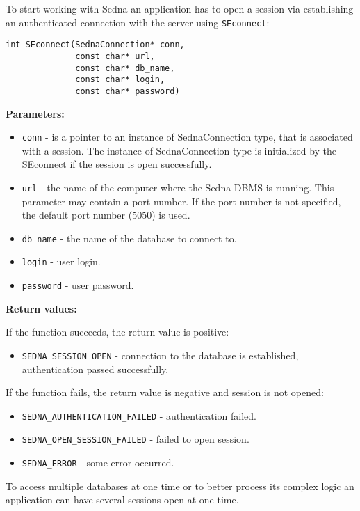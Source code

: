 \documentclass[a4paper,12pt]{article}
\newenvironment{citemize}
{\begin{itemize}
  \setlength{\itemsep}{0pt}
  \setlength{\parskip}{0pt}
  \setlength{\parsep}{0pt}}
{\end{itemize}}
\begin{document}
To start working with Sedna an application has to open a session via
establishing an authenticated connection with the server using \verb!SEconnect!:

\begin{verbatim}
int SEconnect(SednaConnection* conn,
              const char* url,
              const char* db_name,
              const char* login,
              const char* password)
\end{verbatim}

\noindent
\textbf{Parameters:}

\begin{citemize}
\item\verb!conn! - is a pointer to an instance of SednaConnection type, that is
associated with a session. The instance of SednaConnection type is initialized
by the SEconnect if the session is open successfully.
\item\verb!url! - the name of the computer where the Sedna DBMS is running. This
parameter may contain a port number. If the port number is not specified, the
default port number (5050) is used.
\item\verb!db_name! - the name of the database to connect to.
\item\verb!login! - user login.
\item\verb!password! - user password.
\end{citemize}

\noindent
\textbf{Return values:}

\medskip

\noindent
If the function succeeds, the return value is positive:

\begin{citemize}
\item\verb!SEDNA_SESSION_OPEN! - connection to the database is established,
authentication passed successfully.
\end{citemize}

\noindent
If the function fails, the return value is negative and session is not opened:

\begin{citemize}
\item\verb!SEDNA_AUTHENTICATION_FAILED! - authentication failed.
\item\verb!SEDNA_OPEN_SESSION_FAILED! - failed to open session.
\item\verb!SEDNA_ERROR! - some error occurred.
\end{citemize}

To access multiple databases at one time or to better process its complex logic
an application can have several sessions open at one time.
\end{document}
